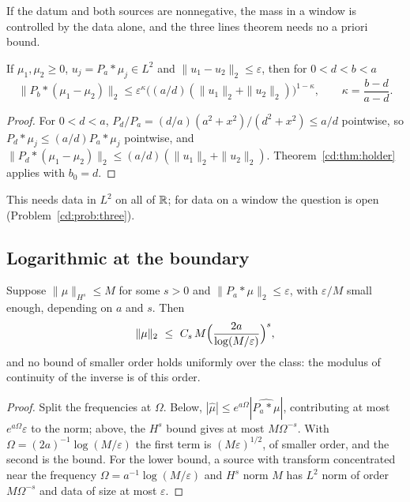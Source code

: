 If the datum and both sources are nonnegative, the mass in a window is controlled by the data alone, and the three lines theorem needs no a priori bound.

\begin{corollary}\label{cd:cor:positive}
If $\mu_1,\mu_2\ge0$, $u_j=P_a*\mu_j\in L^2$ and $\|u_1-u_2\|_2\le\varepsilon$, then for $0<d<b<a$
\[
\|P_b*(\mu_1-\mu_2)\|_2\le\varepsilon^\kappa\bigl((a/d)(\|u_1\|_2+\|u_2\|_2)\bigr)^{1-\kappa},\qquad\kappa=\frac{b-d}{a-d}.
\]
\end{corollary}

\begin{proof}
For $0<d<a$, $P_d/P_a=(d/a)(a^2+x^2)/(d^2+x^2)\le a/d$ pointwise, so $P_d*\mu_j\le(a/d)P_a*\mu_j$ pointwise, and $\|P_d*(\mu_1-\mu_2)\|_2\le(a/d)(\|u_1\|_2+\|u_2\|_2)$. Theorem~\ref{cd:thm:holder} applies with $b_0=d$.
\end{proof}

This needs data in $L^2$ on all of $\mathbb{R}$; for data on a window the question is open (Problem~\ref{cd:prob:three}).

\subsection{Logarithmic at the boundary}

\begin{theorem}\label{cd:thm:log}
Suppose $\|\mu\|_{H^s}\le M$ for some $s>0$ and $\|P_a*\mu\|_2\le\varepsilon$, with $\varepsilon/M$ small enough, depending on $a$ and $s$. Then
\[
\|\mu\|_2\ \le\ C_s\,M\Bigl(\frac{2a}{\log(M/\varepsilon)}\Bigr)^{s},
\]
and no bound of smaller order holds uniformly over the class: the modulus of continuity of the inverse is of this order.
\end{theorem}

\begin{proof}
Split the frequencies at $\Omega$. Below, $|\widehat\mu|\le e^{a\Omega}|\widehat{P_a*\mu}|$, contributing at most $e^{a\Omega}\varepsilon$ to the norm; above, the $H^s$ bound gives at most $M\Omega^{-s}$. With $\Omega=(2a)^{-1}\log(M/\varepsilon)$ the first term is $(M\varepsilon)^{1/2}$, of smaller order, and the second is the bound. For the lower bound, a source with transform concentrated near the frequency $\Omega=a^{-1}\log(M/\varepsilon)$ and $H^s$ norm $M$ has $L^2$ norm of order $M\Omega^{-s}$ and data of size at most $\varepsilon$.
\end{proof}

